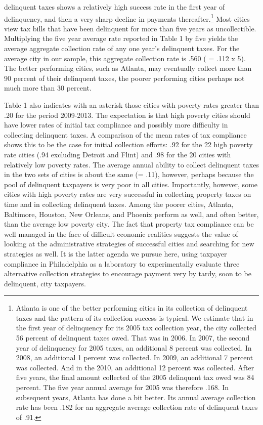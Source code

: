 \documentclass[12pt,titlepage]{article}
\begin{document}
delinquent taxes shows a relatively high success rate in the first
year of delinquency, and then a very sharp decline in payments
thereafter.\footnote{Atlanta is one of the better performing cities in
  its collection of delinquent taxes and the pattern of its collection
  success is typical.  We estimate that in the first year of
  delinquency for its 2005 tax collection year, the city collected 56
  percent of delinquent taxes owed. That was in 2006.  In 2007, the
  second year of delinquency for 2005 taxes, an additional 8 percent
  was collected.  In 2008, an additional 1 percent was collected.  In
  2009, an additional 7 percent was collected.  And in the 2010, an
  additional 12 percent was collected.  After five years, the final
  amount collected of the 2005 delinquent tax owed was 84 percent.
  The five year annual average for 2005 was therefore .168.  In
  subsequent years, Atlanta has done a bit better.  Its annual average
  collection rate has been .182 for an aggregate average collection
  rate of delinquent taxes of .91.} Most cities view tax bills that
have been delinquent for more than five years as uncollectible.
Multiplying the five year average rate reported in Table 1 by five
yields the average aggregate collection rate of any one year's
delinquent taxes.  For the average city in our sample, this aggregate
collection rate is .560 ( = .112 x 5).  The better performing cities,
such as Atlanta, may eventually collect more than 90 percent of their
delinquent taxes, the poorer performing cities perhaps not much more
than 30 percent.

Table 1 also indicates with an asterisk those cities with poverty rates greater than
.20 for the period 2009-2013.  The expectation is that high poverty
cities should have lower rates of initial tax compliance and possibly
more difficulty in collecting delinquent taxes.  A comparison of the
mean rates of tax compliance shows this to be the case for initial
collection efforts: .92 for the 22 high poverty rate cities (.94
excluding Detroit and Flint) and .98 for the 20 cities with relatively
low poverty rates.  The average annual ability to collect delinquent
taxes in the two sets of cities is about the same (= .11), however,
perhaps because the pool of delinquent taxpayers is very poor in all
cities.  Importantly, however, some cities with high poverty rates are
very successful in collecting property taxes on time and in collecting
delinquent taxes.  Among the poorer cities, Atlanta, Baltimore,
Houston, New Orleans, and Phoenix perform as well, and often better,
than the average low poverty city.  The fact that property tax
compliance can be well managed in the face of difficult economic
realities suggests the value of looking at the administrative
strategies of successful cities and searching for new strategies as
well.  It is the latter agenda we pursue here, using taxpayer
compliance in Philadelphia as a laboratory to experimentally evaluate
three alternative collection strategies to encourage payment very by tardy,
soon to be delinquent, city taxpayers.
\end{document}
